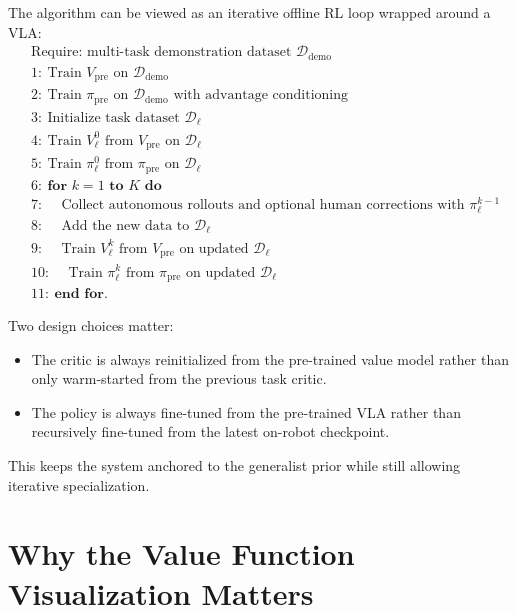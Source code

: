 \documentclass[11pt]{article}
\begin{document}
The algorithm can be viewed as an iterative offline RL loop wrapped around a VLA:
\begin{align*}
&\text{Require: multi-task demonstration dataset } \mathcal{D}_{\text{demo}} \\
&1:\ \text{Train } V_{\text{pre}} \text{ on } \mathcal{D}_{\text{demo}} \\
&2:\ \text{Train } \pi_{\text{pre}} \text{ on } \mathcal{D}_{\text{demo}} \text{ with advantage conditioning} \\
&3:\ \text{Initialize task dataset } \mathcal{D}_{\ell} \\
&4:\ \text{Train } V_{\ell}^{0} \text{ from } V_{\text{pre}} \text{ on } \mathcal{D}_{\ell} \\
&5:\ \text{Train } \pi_{\ell}^{0} \text{ from } \pi_{\text{pre}} \text{ on } \mathcal{D}_{\ell} \\
&6:\ \textbf{for } k = 1 \textbf{ to } K \textbf{ do} \\
&7:\ \quad \text{Collect autonomous rollouts and optional human corrections with } \pi_{\ell}^{k-1} \\
&8:\ \quad \text{Add the new data to } \mathcal{D}_{\ell} \\
&9:\ \quad \text{Train } V_{\ell}^{k} \text{ from } V_{\text{pre}} \text{ on updated } \mathcal{D}_{\ell} \\
&10:\ \quad \text{Train } \pi_{\ell}^{k} \text{ from } \pi_{\text{pre}} \text{ on updated } \mathcal{D}_{\ell} \\
&11:\ \textbf{end for.}
\end{align*}

Two design choices matter:
\begin{itemize}[leftmargin=1.5em]
  \item The critic is always reinitialized from the pre-trained value model rather than only warm-started from the previous task critic.
  \item The policy is always fine-tuned from the pre-trained VLA rather than recursively fine-tuned from the latest on-robot checkpoint.
\end{itemize}

This keeps the system anchored to the generalist prior while still allowing iterative specialization.

\section{Why the Value Function Visualization Matters}
\end{document}
